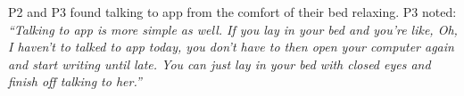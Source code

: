         P2 and P3 found talking to \acl{app} from the comfort of their bed relaxing. P3 noted: 
            \textit{
            ``Talking to \acl{app} is more simple as well. If you lay in your bed and you're like, Oh, I haven't to talked to \acl{app} today, you don't have to then open your computer again and start writing until late. You can just lay in your bed with closed eyes and finish off talking to her.''
            }
        


